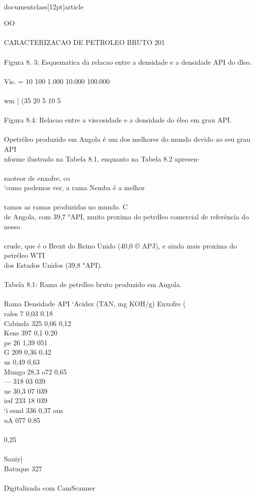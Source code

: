 \\documentclass[12pt]{article}
\begin{document}
OO\\
\\
CARACTERIZACAO DE PETROLEO BRUTO 201\\
\\
Figura 8. 3; Esquematica da relacao entre a densidade e a densidade API do dleo.\\
\\
Vis. = 10 100 1.000 10.000 100.000\\
\\
wm | (35 20 5 10 5\\
\\
Figura 8.4: Relacao entre a viscosidade e a densidade do éleo em grau API.\\
\\
Opetréleo produzido em Angola é um dos melhores do mundo devido ao seu grau API\\
nforme ilustrado na Tabela 8.1, enquanto na Tabela 8.2 apresen-\\
\\
¢aoteor de enxofre, co\\
‘como podemos ver, a rama Nemba é a melhor\\
\\
tamos as ramas produzidas no mundo. C\\
de Angola, com 39,7 °API, muito proxima do petrdleo comercial de referéncia do nosso\\
\\
crude, que é o Brent do Reino Unido (40,0 © APJ), e ainda mais proxima do petréleo WTI\\
dos Estados Unidos (39,8 °API).\\
\\
Tabela 8.1: Rama de petrdleo bruto produzido em Angola.\\
\\
Rama Densidade API ‘Acidez (TAN, mg KOH/g) Enxofre (\\%
rales 7 0,03 0.18\\
Cabinda 325 0,06 0,12\\
Kens 397 0,1 0,20\\
pe 26 1,39 051\\
G 209 0,36 0,42\\
us 0,49 0,63\\
Mungo 28,3 o72 0,65\\
— 318 03 039\\
ue 30,3 07 039\\
ied 233 18 039\\
‘i esnd 336 0,37 ous\\
uA 077 0.85\\
\\
0,25\\
\\
Sauiy|\\
Batuque 327\\
\\
Digitalizada com CamScanner\\
\end{document}
